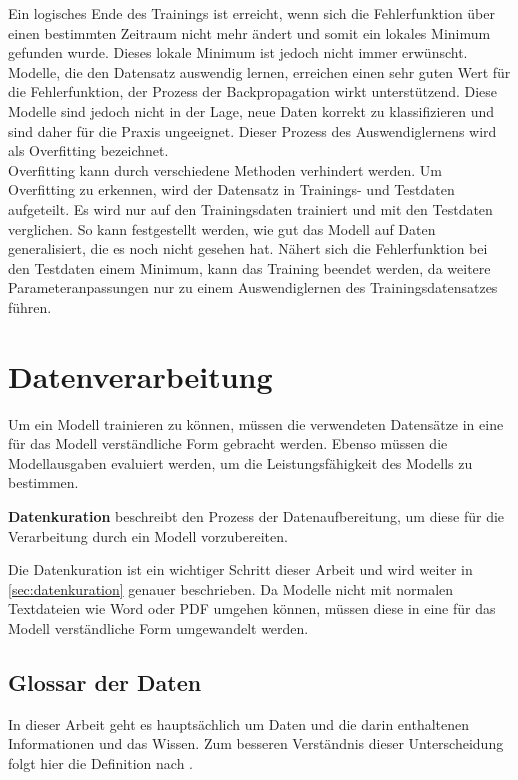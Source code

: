 Ein logisches Ende des Trainings ist erreicht, wenn sich die Fehlerfunktion über einen bestimmten Zeitraum nicht mehr ändert und somit ein lokales Minimum gefunden wurde.
Dieses lokale Minimum ist jedoch nicht immer erwünscht.
Modelle, die den Datensatz auswendig lernen, erreichen einen sehr guten Wert für die Fehlerfunktion, der Prozess der Backpropagation wirkt unterstützend.
Diese Modelle sind jedoch nicht in der Lage, neue Daten korrekt zu klassifizieren und sind daher für die Praxis ungeeignet.
Dieser Prozess des Auswendiglernens wird als Overfitting bezeichnet.\\

Overfitting kann durch verschiedene Methoden verhindert werden.
Um Overfitting zu erkennen, wird der Datensatz in Trainings- und Testdaten aufgeteilt.
Es wird nur auf den Trainingsdaten trainiert und mit den Testdaten verglichen.
So kann festgestellt werden, wie gut das Modell auf Daten generalisiert, die es noch nicht gesehen hat.
Nähert sich die Fehlerfunktion bei den Testdaten einem Minimum, kann das Training beendet werden, da weitere Parameteranpassungen nur zu einem Auswendiglernen des Trainingsdatensatzes führen.\\


\section{Datenverarbeitung}\label{sec:datenverarbeitung}
Um ein Modell trainieren zu können, müssen die verwendeten Datensätze in eine für das Modell verständliche Form gebracht werden.
Ebenso müssen die Modellausgaben evaluiert werden, um die Leistungsfähigkeit des Modells zu bestimmen.\\
\begin{definition}\label{def:datenkuration}
    \textbf{Datenkuration} beschreibt den Prozess der Datenaufbereitung, um diese für die Verarbeitung durch ein Modell vorzubereiten.
\end{definition}
Die Datenkuration ist ein wichtiger Schritt dieser Arbeit und wird weiter in \cref{sec:datenkuration} genauer beschrieben.
Da Modelle nicht mit normalen Textdateien wie Word oder PDF umgehen können, müssen diese in eine für das Modell verständliche Form umgewandelt werden.

\subsection{Glossar der Daten}
In dieser Arbeit geht es hauptsächlich um Daten und die darin enthaltenen Informationen und das Wissen.
Zum besseren Verständnis dieser Unterscheidung folgt hier die Definition nach \citet{bb}.

